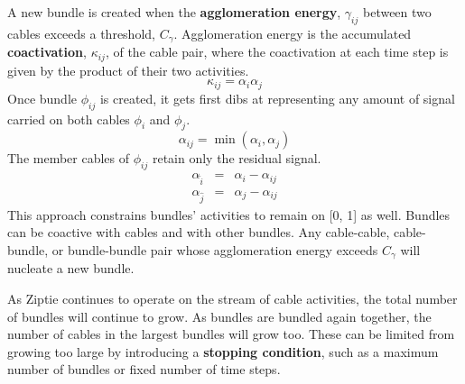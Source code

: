 A new bundle is created when the \textbf{agglomeration energy},
$\gamma_{ij}$
between two cables exceeds a threshold, $C_\gamma$. Agglomeration energy is the
accumulated \textbf{coactivation}, $\kappa_{ij}$, of the cable pair, where the
coactivation at each time step is given by the product of their two
activities.
\begin{equation}
\kappa_{ij} = \alpha_i \alpha_j
\end{equation}
Once bundle $\phi_{ij}$ is created, it gets first dibs at representing any
amount of signal carried on both cables $\phi_i$
and $\phi_j$.
\begin{equation}
\alpha_{ij} = \min(\alpha_i, \alpha_j)
\end{equation}
The member cables of $\phi_{ij}$  retain only the residual signal.
\begin{eqnarray}
\alpha_{\hat{i}} &=& \alpha_i - \alpha_{ij}\\
\alpha_{\hat{j}} &=& \alpha_j - \alpha_{ij}
\end{eqnarray}
This approach constrains bundles' activities to remain on [0, 1] as well.
Bundles can be coactive with cables and with other bundles.
Any cable-cable, cable-bundle, or bundle-bundle pair whose
agglomeration energy exceeds $C_\gamma$ will nucleate
a new bundle.

As Ziptie continues to operate on the stream of cable activities,
the total number of bundles will continue to grow. As bundles are 
bundled again
together, the number of cables in the largest bundles will grow too.
These can be limited from growing too large by introducing
a \textbf{stopping condition}, such as
a maximum number of bundles or fixed number of time steps.









